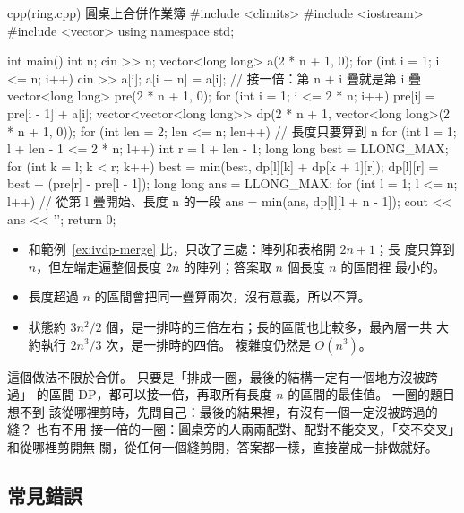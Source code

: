 \begin{example}[label=ex:ivdp-ring]{cpp}{(ring.cpp) 圓桌上合併作業簿}
#include <climits>
#include <iostream>
#include <vector>
using namespace std;

int main() {
    int n;
    cin >> n;
    vector<long long> a(2 * n + 1, 0);
    for (int i = 1; i <= n; i++) {
        cin >> a[i];
        a[i + n] = a[i];                       // 接一倍：第 n + i 疊就是第 i 疊
    }
    vector<long long> pre(2 * n + 1, 0);
    for (int i = 1; i <= 2 * n; i++) {
        pre[i] = pre[i - 1] + a[i];
    }
    vector<vector<long long>> dp(2 * n + 1, vector<long long>(2 * n + 1, 0));
    for (int len = 2; len <= n; len++) {       // 長度只要算到 n
        for (int l = 1; l + len - 1 <= 2 * n; l++) {
            int r = l + len - 1;
            long long best = LLONG_MAX;
            for (int k = l; k < r; k++) {
                best = min(best, dp[l][k] + dp[k + 1][r]);
            }
            dp[l][r] = best + (pre[r] - pre[l - 1]);
        }
    }
    long long ans = LLONG_MAX;
    for (int l = 1; l <= n; l++) {             // 從第 l 疊開始、長度 n 的一段
        ans = min(ans, dp[l][l + n - 1]);
    }
    cout << ans << '\n';
    return 0;
}
\end{example}


\begin{itemize}
\item 和範例~\ref{ex:ivdp-merge} 比，只改了三處：陣列和表格開 $2n + 1$；長
度只算到 $n$，但左端走遍整個長度 $2n$ 的陣列；答案取 $n$ 個長度 $n$ 的區間裡
最小的。
\item 長度超過 $n$ 的區間會把同一疊算兩次，沒有意義，所以不算。
\item 狀態約 $3n^2/2$ 個，是一排時的三倍左右；長的區間也比較多，最內層一共
大約執行 $2n^3/3$ 次，是一排時的四倍。 複雜度仍然是 $O(n^3)$。
\end{itemize}

這個做法不限於合併。 只要是「排成一圈，最後的結構一定有一個地方沒被跨過」
的區間 DP，都可以接一倍，再取所有長度 $n$ 的區間的最佳值。 一圈的題目想不到
該從哪裡剪時，先問自己：最後的結果裡，有沒有一個一定沒被跨過的縫？ 也有不用
接一倍的一圈：圓桌旁的人兩兩配對、配對不能交叉，「交不交叉」和從哪裡剪開無
關，從任何一個縫剪開，答案都一樣，直接當成一排做就好。

\subsection{常見錯誤}

